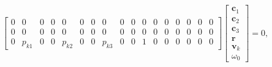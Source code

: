 \documentclass{article}
\begin{document}
\begin{align}
\begin{bmatrix}
        0 & 0 & 0 & 0 & 0 & 0 & 0 & 0 & 0 & 0 & 0 & 0 & 0 & 0 & 0 & 0 & 0 \\
        0 & 0 & 0 & 0 & 0 & 0 & 0 & 0 & 0 & 0 & 0 & 0 & 0 & 0 & 0 & 0 & 0 \\
        0 & p_{k1} & 0 & 0 & p_{k2} & 0 & 0 & p_{k3} & 0 & 0 & 1 & 0 & 0 & 0 & 0 & 0 & 0
    \end{bmatrix}
    \begin{bmatrix}
        \mathbf{c}_1 \\
        \mathbf{c}_2 \\
        \mathbf{c}_3 \\
        \mathbf{r} \\
        \mathbf{v}_k \\
        \omega_0
    \end{bmatrix} = 0,
\end{align}
\end{document}
